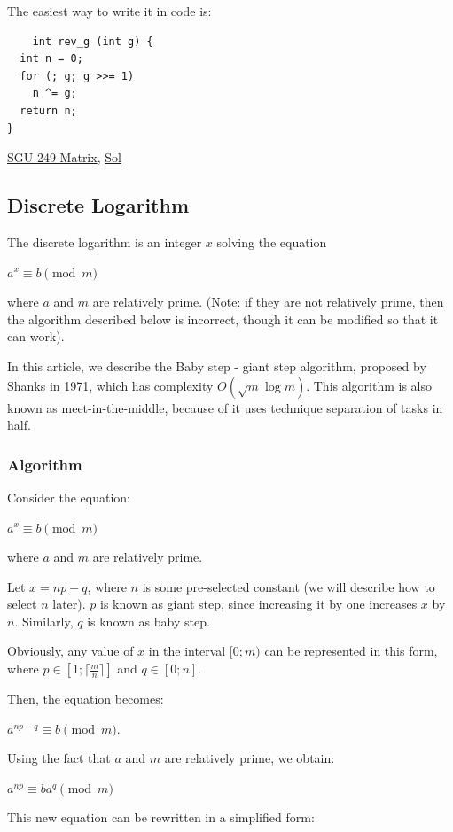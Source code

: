 \documentclass[8pt, a4paper, oneside, twocolumn]{extarticle}
\begin{document}
The easiest way to write it in code is:
\begin{verbatim}
    int rev_g (int g) {
  int n = 0;
  for (; g; g >>= 1)
    n ^= g;
  return n;
}
\end{verbatim}

\href{https://codeforces.com/problemsets/acmsguru/problem/99999/249}{SGU 249 Matrix}, \href{https://github.com/sourabh2311/Competitive-Programming/blob/master/IMP%20QUES/Gray%20Code/SGU249-Matrix.cpp}{Sol}
\subsection{Discrete Logarithm}

The discrete logarithm is an integer $x$ solving the equation

$a^x \equiv b \pmod m$

where $a$ and $m$ are relatively prime. (Note: if they are not relatively prime, then the algorithm described below is incorrect, though it can be modified so that it can work).

In this article, we describe the Baby step - giant step algorithm, proposed by Shanks in 1971, which has complexity $O(\sqrt{m} \log m)$. This algorithm is also known as meet-in-the-middle, because of it uses technique separation of tasks in half.
\subsubsection{Algorithm}

Consider the equation:

$a^x \equiv b \pmod m$

where $a$ and $m$ are relatively prime.

Let $x = np - q$, where $n$ is some pre-selected constant (we will describe how to select $n$ later). $p$ is known as giant step, since increasing it by one increases $x$ by $n$. Similarly, $q$ is known as baby step.

Obviously, any value of $x$ in the interval $[0; m)$ can be represented in this form, where $p \in [1; \lceil \frac{m}{n} \rceil ]$ and $q \in [0; n]$.

Then, the equation becomes:

$a^{np - q} \equiv b \pmod m$.

Using the fact that $a$ and $m$ are relatively prime, we obtain:

$a^{np} \equiv ba^q \pmod m$

This new equation can be rewritten in a simplified form:
\end{document}
